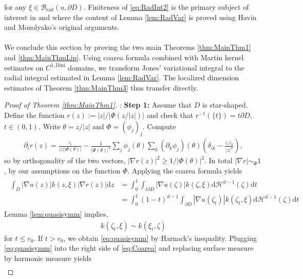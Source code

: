 \documentclass[a4paper,12pt]{article}
\theoremstyle{definition}
\theoremstyle{definition}
\begin{document}
	 for any $\xi\in\mathcal B_{\mathrm{rad}}(u,\partial D)$. Finiteness of \eqref{eq:RadInt2} is the primary subject of interest in \cite{MuellerRiegler2020} and \cite{FMR25} where the content of Lemma \ref{lem:RadVar} is proved using Havin and Mozolyako's original arguments. 
	 \\\\
	We conclude this section by proving the two main Theorems \ref{thm:MainThm1} and \ref{thm:MainThmLip}. Using coarea formula combined with Martin kernel estimates on $C^{1,\mathrm{Dini}}$ domains, we transform Jones' variational integral to the radial integral estimated in Lemma \ref{lem:RadVar}. The localized dimension estimates of Theorem \ref{thm:MainThm3} thus transfer directly.
	\begin{proof}[Proof of Theorem \ref{thm:MainThm1}]:\newline
		\textbf{Step 1:} Assume that $D$ is star-shaped. Define the function $r(z):=|z|/|\Phi(z/|z|)|$ and check that $r^{-1}(\lbrace t\rbrace)=t\partial D$, $t\in(0,1)$. Write $\theta=z/|z|$ and $\Phi=(\phi_j)_j$. Compute 
		\begin{align*}
			\partial_i r(z) = \frac{z_i}{|z||\Phi(\theta)|}-\frac{1}{|\Phi(\theta)|^3}\sum_j\phi_j(\theta)\sum_k(\partial_k\phi_j)(\theta)\left(\delta_{ik}-\frac{z_iz_k}{|z|^2}\right),
		\end{align*}
		so by orthogonality of the two vectors, $|\nabla r(z)|^2\geq1/|\Phi(\theta)|^2$. In total $|\nabla r|\sim_\Phi 1$, by our assumptions on the function $\Phi$.
		Applying the coarea formula yields
		\begin{align}\label{eq:Coarea}
			\begin{aligned}
				\int_{D}|\nabla u(z)|k(z,\xi)|\nabla r(z)|\mathrm{d}z&=\int_0^1\int_{t\partial D} |\nabla u(\zeta)|k(\zeta,\xi)\mathrm{d}\mathcal{H}^{d-1}(\zeta)\mathrm dt\\
				&=\int_0^{1}(1-t)^{d-1}\int_{\partial D}|\nabla u(\zeta_t)|k(\zeta_t,\xi)\mathrm{d}\mathcal{H}^{d-1}(\zeta)\mathrm{d}t
			\end{aligned}
		\end{align}
		Lemma \ref{lem:quasisymm} implies,
		\begin{align}\label{eq:quasisymm}
			k(\zeta_t,\xi)\sim k(\xi_t,\zeta)
		\end{align}
		for $t\leq r_0$. If $t>r_0$, we obtain \eqref{eq:quasisymm} by Harnack's inequality. Plugging \eqref{eq:quasisymm} into the right side of \eqref{eq:Coarea} and replacing surface measure by harmonic measure yields
		\begin{align}\label{eq:RadImpliesFull}

\end{align}
\end{proof}
\end{document}

